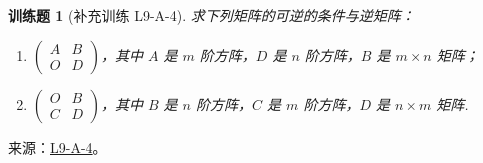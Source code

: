 \documentclass[12pt,fontset=fandol]{ctexart}
\newtheorem{exercise}{训练题}[section]
\begin{document}
\begin{exercise}[补充训练 L9-A-4]\label{prob:L9-A-4}
求下列矩阵的可逆的条件与逆矩阵：
            \begin{enumerate}
                \item $\begin{pmatrix}
                        A & B \\ O & D
                    \end{pmatrix}$，其中 $A$ 是 $m$ 阶方阵，$D$ 是 $n$ 阶方阵，$B$ 是 $m \times n$ 矩阵；

                \item $\begin{pmatrix}
                        O & B \\ C & D
                    \end{pmatrix}$，其中 $B$ 是 $n$ 阶方阵，$C$ 是 $m$ 阶方阵，$D$ 是 $n \times m$ 矩阵.
            \end{enumerate}
\end{exercise}
\noindent 来源：\href{https://github.com/yhwu-is/Linear-Algebra-Left-Undone/blob/new/%E8%AE%B2%E4%B9%89/%E4%B8%93%E9%A2%98/9%20%E7%9F%A9%E9%98%B5%E8%BF%90%E7%AE%97%E8%BF%9B%E9%98%B6.tex}{L9-A-4}。
\end{document}
